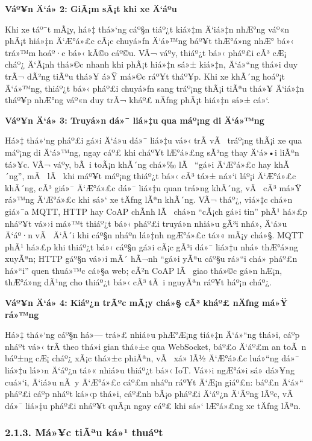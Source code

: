 \documentclass[a4paper]{extarticle}
\begin{document}
\textbf{Váº¥n Ä‘á» 2: GiÃ¡m sÃ¡t khi xe Ä‘áº­u}

Khi xe táº¯t mÃ¡y, há»‡ thá»‘ng cáº§n tiáº¿t kiá»‡m Ä‘iá»‡n nhÆ°ng váº«n phÃ¡t hiá»‡n Ä‘Æ°á»£c cÃ¡c
chuyá»ƒn Ä‘á»™ng báº¥t thÆ°á»ng nhÆ° bá»‹ trá»™m hoáº·c bá»‹ kÃ©o cáº©u. VÃ¬ váº­y, thiáº¿t bá»‹
pháº£i cÃ³ cÆ¡ cháº¿ Ä‘Ã¡nh thá»©c nhanh khi phÃ¡t hiá»‡n sá»± kiá»‡n, Ä‘á»“ng thá»i duy trÃ¬
dÃ²ng tiÃªu thá»¥ á»Ÿ má»©c ráº¥t tháº¥p. Khi xe khÃ´ng hoáº¡t Ä‘á»™ng, thiáº¿t bá»‹ pháº£i
chuyá»ƒn sang tráº¡ng thÃ¡i tiÃªu thá»¥ Ä‘iá»‡n tháº¥p nhÆ°ng váº«n duy trÃ¬ kháº£ nÄƒng
phÃ¡t hiá»‡n sá»± cá»‘.

\textbf{Váº¥n Ä‘á» 3: Truyá»n dá»¯ liá»‡u qua máº¡ng di Ä‘á»™ng}

Há»‡ thá»‘ng pháº£i gá»­i Ä‘á»u dá»¯ liá»‡u vá»‹ trÃ­ vÃ  tráº¡ng thÃ¡i xe qua máº¡ng di Ä‘á»™ng,
ngay cáº£ khi cháº¥t lÆ°á»£ng sÃ³ng thay Ä‘á»•i liÃªn tá»¥c. VÃ¬ váº­y, bÃ i toÃ¡n khÃ´ng
chá»‰ lÃ  ``gá»­i Ä‘Æ°á»£c hay khÃ´ng'', mÃ  lÃ  khi máº¥t máº¡ng thiáº¿t bá»‹ cÃ³ tá»± ná»‘i láº¡i
Ä‘Æ°á»£c khÃ´ng, cÃ³ giá»¯ Ä‘Æ°á»£c dá»¯ liá»‡u quan trá»ng khÃ´ng, vÃ  cÃ³ má»Ÿ rá»™ng Ä‘Æ°á»£c khi
sá»‘ xe tÄƒng lÃªn khÃ´ng. VÃ¬ tháº¿, viá»‡c chá»n giá»¯a MQTT, HTTP hay CoAP chÃ­nh
lÃ  chá»n ``cÃ¡ch gá»­i tin'' phÃ¹ há»£p nháº¥t vá»›i má»™t thiáº¿t bá»‹ pháº£i truyá»n nhiá»u
gÃ³i nhá», Ä‘á»u Ä‘áº·n vÃ  Ä‘Ã´i khi cáº§n nháº­n lá»‡nh ngÆ°á»£c tá»« mÃ¡y chá»§. MQTT
phÃ¹ há»£p khi thiáº¿t bá»‹ cáº§n gá»­i cÃ¡c gÃ³i dá»¯ liá»‡u nhá» thÆ°á»ng xuyÃªn; HTTP gáº§n
vá»›i mÃ´ hÃ¬nh ``gá»­i yÃªu cáº§u rá»“i chá» pháº£n há»“i'' quen thuá»™c cá»§a web; cÃ²n
CoAP lÃ  giao thá»©c gá»n hÆ¡n, thÆ°á»ng dÃ¹ng cho thiáº¿t bá»‹ cÃ³ tÃ i nguyÃªn ráº¥t
háº¡n cháº¿.

\textbf{Váº¥n Ä‘á» 4: Kiáº¿n trÃºc mÃ¡y chá»§ cÃ³ kháº£ nÄƒng má»Ÿ rá»™ng}

Há»‡ thá»‘ng cáº§n há»— trá»£ nhiá»u phÆ°Æ¡ng tiá»‡n Ä‘á»“ng thá»i, cáº­p nháº­t vá»‹ trÃ­ theo
thá»i gian thá»±c qua WebSocket, báº£o Ä‘áº£m an toÃ n báº±ng cÆ¡ cháº¿ xÃ¡c thá»±c
phiÃªn, vÃ  xá»­ lÃ½ Ä‘Æ°á»£c luá»“ng dá»¯ liá»‡u lá»›n Ä‘áº¿n tá»« nhiá»u thiáº¿t bá»‹ IoT. Vá»›i
ngÆ°á»i sá»­ dá»¥ng cuá»‘i, Ä‘iá»u nÃ y Ä‘Æ°á»£c cáº£m nháº­n ráº¥t Ä‘Æ¡n giáº£n: báº£n Ä‘á»“ pháº£i cáº­p
nháº­t ká»‹p thá»i, cáº£nh bÃ¡o pháº£i Ä‘áº¿n Ä‘Ãºng lÃºc, vÃ  dá»¯ liá»‡u pháº£i nháº¥t quÃ¡n
ngay cáº£ khi sá»‘ lÆ°á»£ng xe tÄƒng lÃªn.

\subsubsection{2.1.3. Má»¥c tiÃªu ká»¹
thuáº­t}\label{213-mux1ee5c-tiuxeau-kux1ef9-thuux1eadt}
\end{document}
